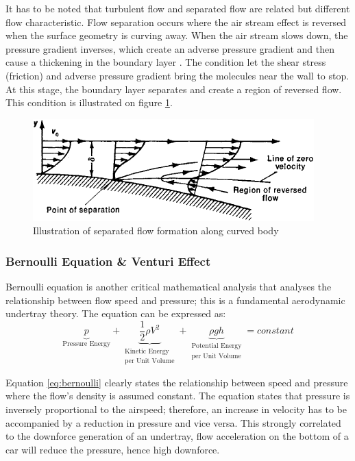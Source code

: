 \noindent It has to be noted that turbulent flow and separated flow are related but different flow characteristic. Flow separation occurs where the air stream effect is reversed when the surface geometry is curving away. When the air stream slows down, the pressure gradient inverses, which create an adverse pressure gradient and then cause a thickening in the boundary layer \cite{Scibor-Rylski1984RoadAerodynamics}. The condition let the shear stress (friction) and adverse pressure gradient bring the molecules near the wall to stop. At this stage, the boundary layer separates and create a region of reversed flow. This condition is illustrated on figure \ref{fig:flow separation}.

\begin{figure}[!ht]
    \centering
    \includegraphics[scale= 0.8]{Figures/flow_separation.png}
    \caption{Illustration of separated flow formation along curved body \cite{Anonymous1979SeparationDictionary}}
    \label{fig:flow separation}
\end{figure}

\subsubsection{Bernoulli Equation \& Venturi Effect}
Bernoulli equation is another critical mathematical analysis that analyses the relationship between flow speed and pressure; this is a fundamental aerodynamic undertray theory. The equation can be expressed as:
\begin{equation}
   \underbrace{p}_\textrm{Pressure Energy} + \underbrace{\frac{1}{2} \rho V^{2}}_{\substack{\text{Kinetic Energy} \\ \text{per Unit Volume}}} + \underbrace{\rho g h}_{\substack{\text{Potential Energy} \\ \text{per Unit Volume}}} = constant
    \label{eq:bernoulli}
\end{equation}

\noindent Equation \ref{eq:bernoulli} clearly states the relationship between speed and pressure where the flow's density is assumed constant. The equation states that pressure is inversely proportional to the airspeed; therefore, an increase in velocity has to be accompanied by a reduction in pressure and vice versa. This strongly correlated to the downforce generation of an undertray, flow acceleration on the bottom of a car will reduce the pressure, hence high downforce.

